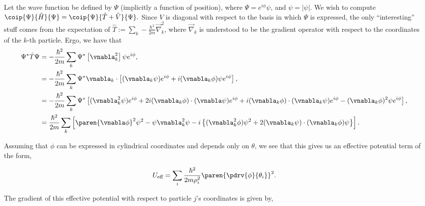 \documentclass[onecolumn,amsmath,amssymb,nofootinbib,floatfix]{revtex4}
\begin{document}
Let the wave function be defined by $\Psi$ (implicitly a function of position), where $\Psi=e^{i\phi} \psi$, and $\psi=|\psi|$.  We wish to compute $\coip{\Psi}{\hat H}{\Psi} = \coip{\Psi}{\hat T+\hat V}{\Psi}.$  Since $V$ is diagonal with respect to the basis in which $\Psi$ is expressed, the only ``interesting'' stuff comes from the expectation of $\hat T:= \sum_k -\frac{\hbar^2}{2m}\vec{\nabla}^2_k$, where $\vec{\nabla}_k$ is understood to be the gradient operator with respect to the coordinates of the $k$-th particle.  Ergo, we have that
$$
\begin{aligned}
\Psi^* \hat T \Psi
&= -\frac{\hbar^2}{2m}\sum_k \Psi^*\left[\vnabla_k^2\right]\psi e^{i\phi},\\
&= -\frac{\hbar^2}{2m}\sum_k \Psi^* \vnabla_k\cdot \left[(\vnabla_k \psi) e^{i\phi} + i(\vnabla_k \phi) \psi e^{i\phi}\right],\\
&= -\frac{\hbar^2}{2m}\sum_k \Psi^* \left[(\vnabla_k^2 \psi) e^{i\phi} + 2 i(\vnabla_k \phi) \cdot(\vnabla\psi) e^{i\phi} + i(\vnabla_k\phi)\cdot(\vnabla_k\psi)e^{i\phi} - (\vnabla_k \phi)^2 \psi e^{i\phi}\right],\\
&= \frac{\hbar^2}{2m}\sum_k \left[\paren{\vnabla \phi}^2\psi^2 - \psi\vnabla_k^2\psi - i\left\{(\vnabla_k^2 \phi)\psi^2 + 2(\vnabla_k\psi) \cdot (\vnabla_k \phi)\psi\right\}\right].
\end{aligned}
$$

Assuming that $\phi$ can be expressed in cylindrical coordinates and depends only on $\theta$, we see that this gives us an effective potential term of the form,

$$U_{\text{eff}} = \sum_i \frac{\hbar^2}{2m\rho_i^2}\paren{\pdrv{\phi}{\theta_i}}^2.$$

The gradient of this effective potential with respect to particle $j$'s coordinates is given by,
\end{document}
